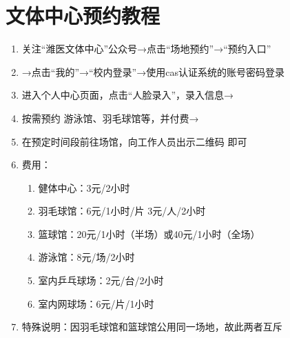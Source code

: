 \section[文体中心预约教程]{文体中心预约教程}
\label{sports_center}
\begin{enumerate}
    \item 关注“潍医文体中心”公众号→点击“场地预约”→“预约入口”
    \item →点击“我的”→“校内登录”→使用cas认证系统的账号密码登录
    \item 进入个人中心页面，点击“人脸录入”，录入信息→
    \item 按需预约 游泳馆、羽毛球馆等，并付费→
    \item 在预定时间段前往场馆，向工作人员出示二维码 即可
    \item 费用：
          \begin{enumerate}
              \item 健体中心：3元/2小时
              \item 羽毛球馆\footnotemark：6元/1小时/片 3元/人/2小时
              \item 篮球馆：20元/1小时（半场）或40元/1小时（全场）
              \item 游泳馆\footnotemark：8元/场/2小时
              \item 室内乒乓球场：2元/台/2小时
              \item 室内网球场：6元/片/1小时
          \end{enumerate}
    \item 特殊说明：因羽毛球馆和篮球馆公用同一场地，故此两者互斥
\end{enumerate}
